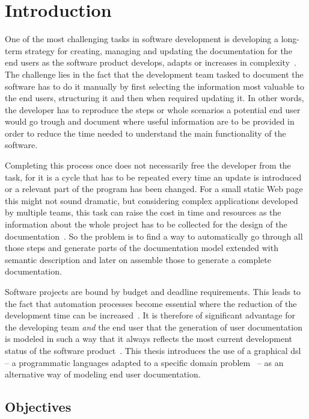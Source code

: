 \chapter{Introduction}\label{ch:intro}

One of the most challenging tasks in software development is developing a long-term strategy for creating, managing and updating the documentation for the end users as the software product develops, adapts or increases in complexity~\cite{ieee6081814}. The challenge lies in the fact that the development team tasked to document the software has to do it manually by first selecting the information most valuable to the end users, structuring it and then when required updating it. In other words, the developer has to reproduce the steps or whole scenarios a potential end user would go trough and document where useful information are to be provided in order to reduce the time needed to understand the main functionality of the software. 

Completing this process once does not necessarily free the developer from the task, for it is a cycle that has to be repeated every time an update is introduced or a relevant part of the program has been changed. For a small static Web page this might not sound dramatic, but considering complex applications developed by multiple teams, this task can raise the cost in time and resources as the information about the whole project has to be collected for the design of the documentation~\cite{ieee5712775}. So the problem is to find a way to automatically go through all those steps and generate parts of the documentation model extended with semantic description and later on assemble those to generate a complete documentation.

Software projects are bound by budget and deadline requirements. This leads to the fact that automation processes become essential where the reduction of the development time can be increased~\cite{despa2014comparative}. It is therefore of significant advantage for the developing team \textit{and} the end user that the generation of user documentation is modeled in such a way that it always reflects the most current development status of the software product~\cite{waits_et_al}. This thesis introduces the use of a graphical \gls{dsl} -- a programmatic languages adapted to a specific domain problem~\cite{perez-et_al} -- as an alternative way of modeling end user documentation.

\section{Objectives}\label{sec:objectives}

